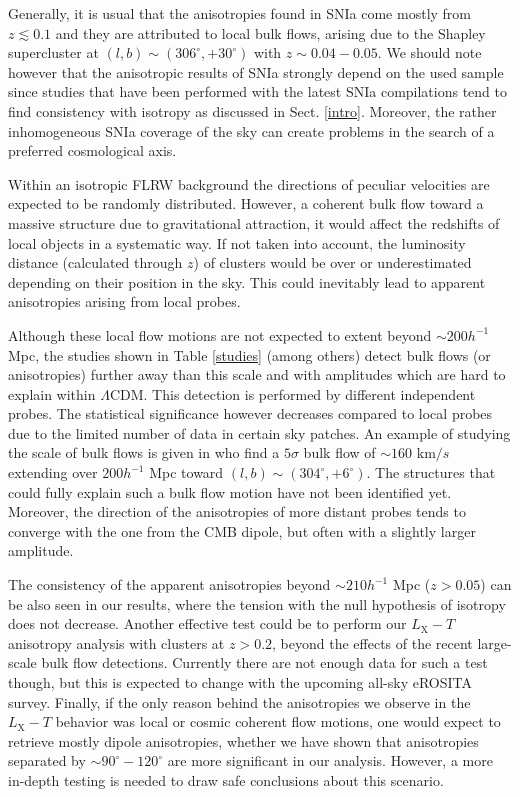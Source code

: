 \documentclass{aa}   %
\begin{document}
Generally, it is usual that the anisotropies found in SNIa come mostly from $z\lesssim 0.1$ and they are attributed to local bulk flows, arising due to the Shapley supercluster at $(l,b)\sim(306^{\circ}, +30^{\circ})$ with $z\sim0.04-0.05$. We should note however that the anisotropic results of SNIa strongly depend on the used sample since studies that have been performed with the latest SNIa compilations tend to find consistency with isotropy as discussed in Sect. \ref{intro}. Moreover, the rather inhomogeneous SNIa coverage of the sky can create problems in the search of a preferred cosmological axis.

Within an isotropic FLRW background the directions of peculiar velocities are expected to be randomly distributed. However, a coherent bulk flow toward a massive structure due to gravitational attraction, it would affect the redshifts of local objects in a systematic way. If not taken into account, the luminosity distance (calculated through $z$) of clusters would be over or underestimated depending on their position in the sky. This could inevitably lead to apparent anisotropies arising from local probes.

Although these local flow motions are not expected to extent beyond $\sim 200h^{-1}$ Mpc, the studies shown in Table \ref{studies} (among others) detect bulk flows (or anisotropies) further away than this scale and with amplitudes which are hard to explain within $\Lambda$CDM. This detection is performed by different independent probes. The statistical significance however decreases compared to local probes due to the limited number of data in certain sky patches. An example of studying the scale of bulk flows is given in \citet{carrick} who find a $5\sigma$ bulk flow of $\sim 160$ km$/s$ extending over $200h^{-1}$ Mpc toward $(l,b)\sim (304^{\circ}, +6^{\circ})$.  The structures that could fully explain such a bulk flow motion have not been identified yet. Moreover, the direction of the anisotropies of more distant probes tends to converge with the one from the CMB dipole, but often with a slightly larger amplitude.

The consistency of the apparent anisotropies beyond $\sim 210h^{-1}$ Mpc ($z>0.05$) can be also seen in our results, where the tension with the null hypothesis of isotropy does not  decrease. Another effective test could be to perform our $L_{\text{X}}-T$ anisotropy analysis with clusters at $z>0.2$, beyond the effects of the recent large-scale bulk flow detections. Currently there are not enough data for such a test though, but this is expected to change with the upcoming all-sky eROSITA survey. Finally, if the only reason behind the anisotropies we observe in the $L_{\text{X}}-T$ behavior was local or cosmic coherent flow motions, one would expect to retrieve mostly dipole anisotropies, whether we have shown that anisotropies separated by $\sim 90^{\circ}-120^{\circ}$ are more significant in our analysis. However, a more in-depth testing is needed to draw safe conclusions about this scenario.
\end{document}
